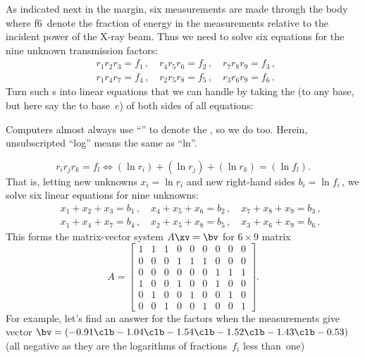 \begin{example}
As indicated next in the margin, six  measurements are made through the body where \hlist f6\ denote the fraction of energy in the measurements relative to the incident power of the X-ray beam.
%
Thus we need to solve six equations for the nine unknown transmission factors:
\begin{eqnarray*}
&&
r_1r_2r_3=f_1\,,\quad
r_4r_5r_6=f_2\,,\quad
r_7r_8r_9=f_3\,,\quad
\\&&
r_1r_4r_7=f_4\,,\quad
r_2r_5r_8=f_5\,,\quad
r_3r_6r_9=f_6\,.\quad
\end{eqnarray*}
Turn such s into linear equations that we can handle by taking the  (to any base, but here say the  to base~\(e\)) of both sides of all equations:
\begin{aside}
Computers almost always use ``'' to denote the , so we do too.  Herein, unsubscripted ``log'' means the same as ``ln''.
\end{aside}
\begin{equation*}
r_ir_jr_k=f_l \iff (\ln r_i)+(\ln r_j)+(\ln r_k)=(\ln f_l).
\end{equation*}
That is, letting new unknowns \(x_i=\ln r_i\) and new right-hand sides \(b_i=\ln f_i\)\,, we solve six linear equations for nine unknowns:
\begin{eqnarray*}&&
x_1+x_2+x_3=b_1\,,\quad
x_4+x_5+x_6=b_2\,,\quad
x_7+x_8+x_9=b_3\,,
\\&&
x_1+x_4+x_7=b_4\,,\quad
x_2+x_5+x_8=b_5\,,\quad
x_3+x_6+x_9=b_6\,.
\end{eqnarray*}
This forms the matrix-vector system \(A\xv=\bv\) for \(6\times9\) matrix
\begin{equation*}
A=\begin{bmatrix} 
 1&1&1&0&0&0&0&0&0 \\
 0&0&0&1&1&1&0&0&0 \\
 0&0&0&0&0&0&1&1&1 \\
 1&0&0&1&0&0&1&0&0 \\
 0&1&0&0&1&0&0&1&0 \\
 0&0&1&0&0&1&0&0&1 \end{bmatrix}.
\end{equation*}
For example, let's find an answer for the factors when the measurements give vector \(\bv=(-0.91\clb -1.04\clb -1.54\clb -1.52\clb -1.43\clb -0.53)\) (all negative as they are the logarithms of fractions~\(f_i\) less than~one)
\setbox\ajrqrbox\hbox{\qrcode{%
A=[1 1 1 0 0 0 0 0 0 
 0 0 0 1 1 1 0 0 0 
}}
\end{example}
